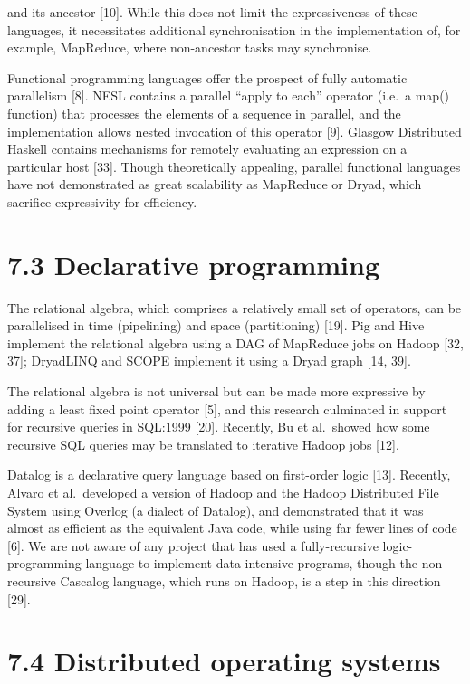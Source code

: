 \documentclass[
]{article}
\begin{document}
and its ancestor {[}10{]}. While this does not limit the expressiveness
of these languages, it necessitates additional synchronisation in the
implementation of, for example, MapReduce, where non-ancestor tasks may
synchronise.

Functional programming languages offer the prospect of fully automatic
parallelism {[}8{]}. NESL contains a parallel ``apply to each'' operator
(i.e.~a map() function) that processes the elements of a sequence in
parallel, and the implementation allows nested invocation of this
operator {[}9{]}. Glasgow Distributed Haskell contains mechanisms for
remotely evaluating an expression on a particular host {[}33{]}. Though
theoretically appealing, parallel functional languages have not
demonstrated as great scalability as MapReduce or Dryad, which sacrifice
expressivity for efficiency.

\section{7.3 Declarative programming}\label{declarative-programming}

The relational algebra, which comprises a relatively small set of
operators, can be parallelised in time (pipelining) and space
(partitioning) {[}19{]}. Pig and Hive implement the relational algebra
using a DAG of MapReduce jobs on Hadoop {[}32, 37{]}; DryadLINQ and
SCOPE implement it using a Dryad graph {[}14, 39{]}.

The relational algebra is not universal but can be made more expressive
by adding a least fixed point operator {[}5{]}, and this research
culminated in support for recursive queries in SQL:1999 {[}20{]}.
Recently, Bu et al.~showed how some recursive SQL queries may be
translated to iterative Hadoop jobs {[}12{]}.

Datalog is a declarative query language based on first-order logic
{[}13{]}. Recently, Alvaro et al.~developed a version of Hadoop and the
Hadoop Distributed File System using Overlog (a dialect of Datalog), and
demonstrated that it was almost as efficient as the equivalent Java
code, while using far fewer lines of code {[}6{]}. We are not aware of
any project that has used a fully-recursive logic-programming language
to implement data-intensive programs, though the non-recursive Cascalog
language, which runs on Hadoop, is a step in this direction {[}29{]}.

\section{7.4 Distributed operating
systems}\label{distributed-operating-systems}
\end{document}
